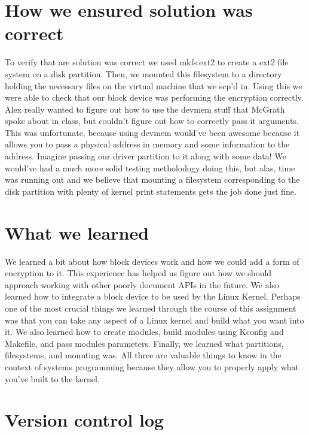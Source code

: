 \documentclass[letterpaper,10pt,titlepage]{article}
\begin{document}
\section{How we ensured solution was correct}
To verify that are solution was correct we used mkfs.ext2 to create a ext2 file system on a disk partition. Then, we mounted this filesystem to a directory holding the necessary files on the virtual machine that we scp'd in. Using this we were able to check that our block device was performing the encryption correctly. Alex really wanted to figure out how to use the devmem stuff that McGrath spoke about in class, but couldn't figure out how to correctly pass it arguments. This was unfortunate, because using devmem would've been awesome because it allows you to pass a physical address in memory and some information to the address. Imagine passing our driver partition to it along with some data! We would've had a much more solid testing metholodogy doing this, but alas, time was running out and we believe that mounting a filesystem corresponding to the disk partition with plenty of kernel print statements gets the job done just fine.

\section{What we learned}
We learned a bit about how block devices work and how we could add a form of encryption to it. This experience has helped us figure out how we should approach working with other poorly document APIs in the future. We also learned how to integrate a block device to be used by the Linux Kernel. Perhaps one of the most crucial things we learned through the course of this assignment was that you can take any aspect of a Linux kernel and build what you want into it. We also learned how to create modules, build modules using Kconfig and Makefile, and pass modules parameters. Finally, we learned what partitions, filesystems, and mounting was. All three are valuable things to know in the context of systems programming because they allow you to properly apply what you've built to the kernel.

\section{Version control log}
\begin{versionhistory}
\end{versionhistory}
\end{document}

